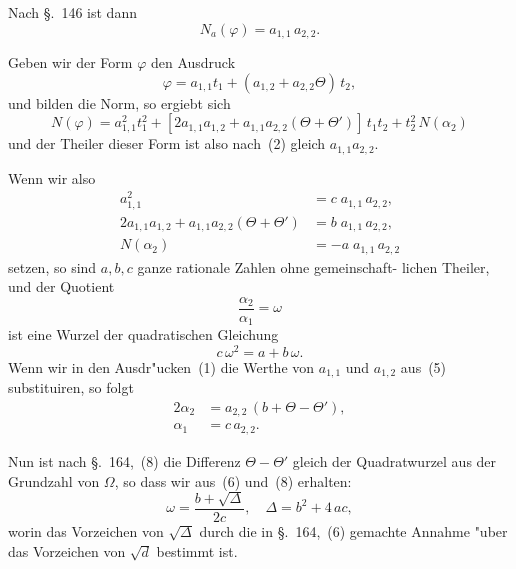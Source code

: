 \documentclass[12pt,a4paper]{article}
\theoremstyle{weber}
\begin{document}
Nach \S.~146 ist dann
\begin{equation}\label{eq:s166-2}
N_a(\varphi) = a_{1,1}\,a_{2,2}.
\end{equation}

Geben wir der Form $\varphi$ den Ausdruck
\begin{equation}\label{eq:s166-3}
\varphi = a_{1,1}t_1 + (a_{1,2} + a_{2,2}\varTheta)\,t_2,
\end{equation}
und bilden die Norm, so ergiebt sich
\begin{equation}\label{eq:s166-4}
N(\varphi) = a_{1,1}^2t_1^2 + [2a_{1,1}a_{1,2} + a_{1,1}a_{2,2}(\varTheta + \varTheta')]\,t_1t_2 + t_2^2\,N(\alpha_2)
\end{equation}
und der Theiler dieser Form ist also nach~(2) gleich $a_{1,1}a_{2,2}$.

Wenn wir also
\begin{equation}\label{eq:s166-5}
\begin{aligned}
a_{1,1}^2 &= c\;a_{1,1}\,a_{2,2}, \\
2a_{1,1}a_{1,2} + a_{1,1}a_{2,2}(\varTheta + \varTheta') &= b\;a_{1,1}\,a_{2,2}, \\
N(\alpha_2) &= -a\;a_{1,1}\,a_{2,2}
\end{aligned}
\end{equation}
setzen, so sind $a, b, c$ ganze rationale Zahlen ohne gemeinschaft-
lichen Theiler, und der Quotient
\begin{equation}\label{eq:s166-6}
\frac{\alpha_2}{\alpha_1} = \omega
\end{equation}
ist eine Wurzel der quadratischen Gleichung
\begin{equation}\label{eq:s166-7}
c\,\omega^2 = a + b\,\omega.
\end{equation}
Wenn wir in den Ausdr"ucken~(1) die Werthe von $a_{1,1}$ und $a_{1,2}$
aus~(5) substituiren, so folgt
\begin{equation}\label{eq:s166-8}
\begin{aligned}
2\alpha_2 &= a_{2,2}\,(b + \varTheta - \varTheta'), \\
\alpha_1 &= c\,a_{2,2}.
\end{aligned}
\end{equation}

Nun ist nach \S.~164,~(8) die Differenz $\varTheta - \varTheta'$ gleich der
Quadratwurzel aus der Grundzahl von $\varOmega$, so dass wir aus~(6)
und~(8) erhalten:
\begin{equation}\label{eq:s166-9}
\omega = \frac{b + \sqrt{\varDelta}}{2c}, \quad \varDelta = b^2 + 4\,ac,
\end{equation}
worin das Vorzeichen von $\sqrt{\varDelta}$ durch die in \S.~164,~(6) gemachte
Annahme "uber das Vorzeichen von $\sqrt{d}$ bestimmt ist.
\end{document}
